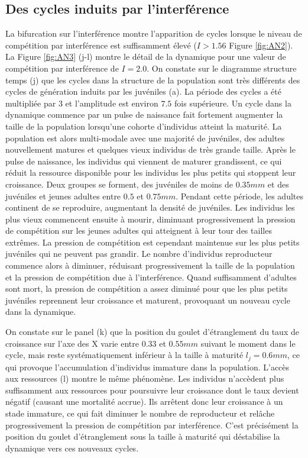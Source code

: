 \subsection{Des cycles induits par l'interférence}

La bifurcation sur l'interférence montre l'apparition de cycles lorsque le
niveau de compétition par interférence est suffisamment élevé ($I>1.56$ Figure
\ref{fig:AN2}). La Figure \ref{fig:AN3} (j-l) montre le détail de la dynamique
pour une valeur de compétition par interférence de $I=2.0$. On constate sur le
diagramme structure temps (j) que les cycles dans la structure de la population
sont très différents des cycles de génération induits par les juvéniles (a). La
période des cycles a été multipliée par $3$ et l'amplitude est environ $7.5$
fois supérieure. Un cycle dans la dynamique commence par un pulse de naissance
fait fortement augmenter la taille de la population lorsqu'une cohorte d'individus
atteint la maturité. La population est alors multi-modale avec une majorité
de juvéniles, des adultes nouvellement matures et quelques vieux individus de
très grande taille. Après le pulse de naissance, les individus qui viennent de
maturer grandissent, ce qui réduit la ressource disponible pour les individus
les plus petits qui stoppent leur croissance. Deux groupes se forment, des
juvéniles de moins de $0.35mm$ et des juvéniles et jeunes adultes entre $0.5$ et
$0.75mm$. Pendant cette période, les adultes continent de se reproduire,
augmentant la densité de juvéniles. Les individus les plus vieux commencent
ensuite à mourir, diminuant progressivement la pression de compétition sur les
jeunes adultes qui atteignent à leur tour des tailles extrêmes. La pression de
compétition est cependant maintenue sur les plus petits juvéniles qui ne peuvent
pas grandir. Le nombre d'individus reproducteur commence alors à diminuer,
réduisant progressivement la taille de la population et la pression de
compétition due à l'interférence. Quand suffisamment d'adultes sont mort, la
pression de compétition a assez diminué pour que les plus petits juvéniles
reprennent leur croissance et maturent, provoquant un nouveau cycle dans la
dynamique. 

On constate sur le panel (k) que la position du goulet d'étranglement du taux de
croissance sur l'axe des X varie entre $0.33$ et $0.55mm$ suivant le moment dans
le cycle, mais reste systématiquement inférieur à la taille à maturité
$l_j=0.6mm$, ce qui provoque l'accumulation d'individus immature dans la
population. L'accès aux ressources (l) montre le même phénomène. Les individus
n'accèdent plus suffisamment aux ressources pour poursuivre leur croissance dont
le taux devient négatif (causant une mortalité accrue). Ils arrêtent donc leur
croissance à un stade immature, ce qui fait diminuer le nombre de reproducteur
et relâche progressivement la pression de compétition par interférence. C'est
précisément la position du goulet d'étranglement sous la taille à maturité qui
déstabilise la dynamique vers ces nouveaux cycles. 

